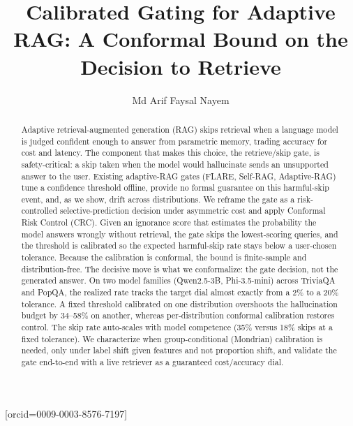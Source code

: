 \documentclass[a4paper,fleqn]{cas-dc}
\begin{document}
\let\WriteBookmarks\relax


\title[mode=title]{Calibrated Gating for Adaptive RAG: A Conformal Bound on the Decision to Retrieve}

\author[1]{Md Arif Faysal Nayem}[orcid=0009-0003-8576-7197]
\cormark[1]


\begin{abstract}
Adaptive retrieval-augmented generation (RAG) skips retrieval when a language
model is judged confident enough to answer from parametric memory, trading
accuracy for cost and latency. The component that makes this choice, the
retrieve/skip gate, is safety-critical: a skip taken when the model would
hallucinate sends an unsupported answer to the user. Existing adaptive-RAG gates
(FLARE, Self-RAG, Adaptive-RAG) tune a confidence threshold offline, provide no
formal guarantee on this harmful-skip event, and, as we show, drift across
distributions. We reframe the gate as a risk-controlled
selective-prediction decision under asymmetric cost and apply Conformal Risk
Control (CRC). Given an ignorance score that estimates the probability the model
answers wrongly without retrieval, the gate skips the lowest-scoring queries,
and the threshold is calibrated so the expected harmful-skip rate stays below a
user-chosen tolerance. Because the calibration is conformal, the bound is
finite-sample and distribution-free. The decisive move is what we conformalize:
the gate decision, not the generated answer. On two model families
(Qwen2.5-3B, Phi-3.5-mini) across TriviaQA and PopQA, the realized rate tracks
the target dial almost exactly from a 2\% to a 20\% tolerance. A fixed
threshold calibrated on one distribution overshoots the hallucination budget by
34--58\% on another, whereas per-distribution conformal calibration restores
control. The skip rate auto-scales with model competence (35\% versus 18\% skips
at a fixed tolerance). We characterize when group-conditional (Mondrian)
calibration is needed, only under label shift given features and not proportion
shift, and validate the gate end-to-end with a live retriever as a guaranteed
cost/accuracy dial.
\end{abstract}
\end{document}
